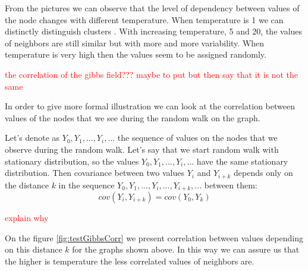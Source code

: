 \documentclass[12pt]{report}
\newcommand\myworries[1]{\textcolor{red}{#1}}
\begin{document}
From the pictures we can observe that the level of dependency between values of the node changes with different temperature. When temperature is 1 we can distinctly distinguish clusters . With increasing temperature, 5 and 20, the values of neighbors are still similar but with more and more variability. When temperature is very high then the values seem to be assigned randomly.

\myworries{the correlation of the gibbs field??? maybe to put but then say that it is not the same}

In order to give more formal illustration we can look at the correlation between values of the nodes that we see during the random walk on the graph.

Let's denote as $Y_0, Y_1, ..., Y_i, ...$  the sequence of values on the nodes that we observe during the random walk. Let's say that we start random walk with stationary distribution, so the values $Y_0, Y_1, ..., Y_i, ...$ have the same stationary distribution. Then covariance between  two values $Y_i$ and $Y_{i+k}$ depends only on the distance $k$ in the sequence $Y_0, Y_1, ..., Y_i, ..., Y_{i+k}, ...$ between them:
$$cov(Y_i, Y_{i+k}) = cov(Y_0, Y_k)$$

\myworries{explain why}

On the figure \ref{fig:testGibbsCorr} we present correlation between values depending on this distance $k$ for the graphs shown above. In this way we can assure us that the higher is temperature the less correlated values of neighbors are.
\end{document}
